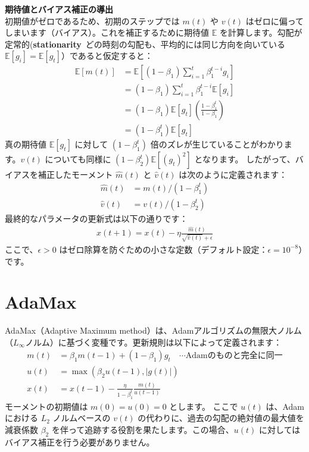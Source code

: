 \documentclass[dvipdfmx,a4paper,11pt]{jsarticle}
\begin{document}
\hosoku \textbf{期待値とバイアス補正の導出}\\
初期値がゼロであるため、初期のステップでは $m(t)$ や $v(t)$ はゼロに偏ってしまいます（バイアス）。これを補正するために期待値 $\mathbb{E}$ を計算します。勾配が定常的(\textbf{stationarity}\ どの時刻の勾配も、平均的には同じ方向を向いている\ie $\mathbb{E}[g_i] = \mathbb{E}[g_t]$）であると仮定すると：
\begin{align*}
    \mathbb{E}[m(t)] &= \mathbb{E}\left[ (1 - \beta_1) \sum_{i=1}^t \beta_1^{t-i} g_i \right] \\
                     &= (1 - \beta_1) \sum_{i=1}^t \beta_1^{t-i} \mathbb{E}[g_i] \\
                     &= (1 - \beta_1) \mathbb{E}[g_t] \left( \frac{1 - \beta_1^t}{1 - \beta_1} \right) \\
                     &= (1 - \beta_1^t) \mathbb{E}[g_t]
\end{align*}
真の期待値 $\mathbb{E}[g_t]$ に対して $(1 - \beta_1^t)$ 倍のズレが生じていることがわかります。$v(t)$ についても同様に $(1 - \beta_2^t)\mathbb{E}[(g_t)^2]$ となります。
したがって、バイアスを補正したモーメント $\hat{m}(t)$ と $\hat{v}(t)$ は次のように定義されます：
\begin{align*}
    \hat{m}(t) &= m(t) / (1 - \beta_1^t) \\
    \hat{v}(t) &= v(t) / (1 - \beta_2^t)
\end{align*}
最終的なパラメータの更新式は以下の通りです：
\begin{align*}
    x(t + 1) = x(t) - \eta \frac{\hat{m}(t)}{\sqrt{\hat{v}(t)} + \epsilon}
\end{align*}
ここで、$\epsilon > 0$ はゼロ除算を防ぐための小さな定数（デフォルト設定：$\epsilon=10^{-8}$）です。

\section{AdaMax}
AdaMax（Adaptive Maximum method）は、Adamアルゴリズムの無限大ノルム（$L_\infty$ノルム）に基づく変種です。更新規則は以下によって定義されます：
\begin{align*}
    m(t) &= \beta_1 m(t - 1) + (1 - \beta_1)g_t \quad\cdots\text{Adamのものと完全に同一}\\
    u(t) &= \max(\beta_2 u(t - 1), |g(t)|) \\
    x(t) &= x(t - 1) - \frac{\eta}{1 - \beta_1^t} \frac{m(t)}{u(t - 1)}
\end{align*}
モーメントの初期値は $m(0) = u(0) = 0$ とします。
ここで $u(t)$ は、Adamにおける $L_2$ ノルムベースの $v(t)$ の代わりに、過去の勾配の絶対値の最大値を減衰係数 $\beta_2$ を伴って追跡する役割を果たします。この場合、$u(t)$ に対してはバイアス補正を行う必要がありません。
\end{document}
